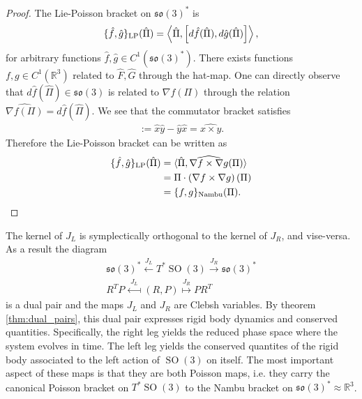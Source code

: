 \documentclass[12pt]{amsart}
\newcommand{\so}{\ensuremath{\mathfrak{so}}}
\DeclareMathOperator{\SO}{SO}
\begin{document}
  \begin{proof}
    The Lie-Poisson bracket on $\so(3)^*$ is
    \begin{align*}
      \{ \hat{f} , \hat{g} \}_{\rm LP} (\hat{\Pi}) =
      \left \langle \hat{\Pi} , \left[ d\hat{f}(\hat{\Pi}) , d\hat{g}(\hat{\Pi}) \right]
        \right \rangle,
    \end{align*}
    for arbitrary functions $\hat{f},\hat{g} \in C^1(\so(3)^*)$.
    There exists functions $f,g \in C^1(\mathbb{R}^3)$ related to $\hat{F},\hat{G}$ through the hat-map.
    One can directly observe that $d\hat{f}(\hat{\Pi}) \in \so(3)$ is 
    related to $\nabla f(\Pi)$ through the relation $\widehat{ \nabla f(\Pi)} = d\hat{f}( \hat{\Pi})$.
    We see that the commutator bracket satisfies
    \begin{align*}
      [\hat{x},\hat{y} ] := \hat{x} \hat{y} - \hat{y} \hat{x} = \widehat{x \times y }.
    \end{align*}
    Therefore the Lie-Poisson bracket can be written as
    \begin{align*}
    \{ \hat{f} , \hat{g} \}_{\rm LP}(\hat{\Pi})
    &= \langle \hat{\Pi} , \widehat{ \nabla f \times \nabla g }(\Pi) \rangle \\
    &= \Pi \cdot  \left( \nabla f \times \nabla g \right)(\Pi) \\
    &= \{ f , g \}_{\rm Nambu}(\Pi).
    \end{align*}
  \end{proof}

  The kernel of $J_L$ is symplectically orthogonal
  to the kernel of $J_R$, and vise-versa.
  As a result the diagram
  \begin{align*}
    \so(3)^* \stackrel{J_L}{\longleftarrow}
    T^{\ast}\SO(3)
    \stackrel{J_R}{\longrightarrow} \so(3)^* \\
    R^T P \stackrel{J_L}{\longmapsfrom}
    (R,P)
    \stackrel{J_R}{\longmapsto} P R^T
  \end{align*}
  is a dual pair and the maps $J_L$ and $J_R$ are Clebsh variables.
  By theorem \ref{thm:dual_pairs}, this dual pair expresses rigid
  body dynamics and conserved quantities.
  Specifically, the right leg yields the reduced phase space where 
  the system evolves in time.
  The left leg yields the conserved quantites of the rigid body
  associated to the left action of $\SO(3)$ on itself.
  The most important aspect of these maps is that they are both Poisson
  maps, i.e. they carry the canonical Poisson bracket on $T^{\ast}\SO(3)$
  to the Nambu bracket on $\so(3)^* \approx \mathbb{R}^3$.
\end{document}
